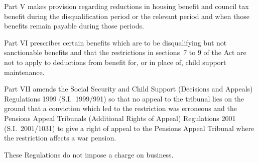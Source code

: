 \documentclass[12pt,a4paper]{article}
\begin{document}
Part V makes provision regarding reductions in housing benefit and council tax benefit during the disqualification period or the relevant period and when those benefits remain payable during those periods.

Part VI prescribes certain benefits which are to be disqualifying but not sanctionable benefits and that the restrictions in sections~7 to 9 of the Act are not to apply to deductions from benefit for, or in place of, child support maintenance.

Part VII amends the Social Security and Child Support (Decisions and Appeals) Regulations 1999 (S.I.~1999/991) so that no appeal to the tribunal lies on the ground that a conviction which led to the restriction was erroneous and the Pensions Appeal Tribunals (Additional Rights of Appeal) Regulations 2001 (S.I.~2001/1031) to give a right of appeal to the Pensions Appeal Tribunal where the restriction affects a war pension.

These Regulations do not impose a charge on business. 
\end{document}
